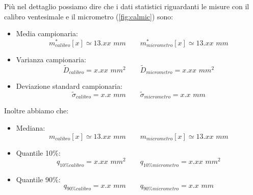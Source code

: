 \newpage
Più nel dettaglio possiamo dire che i dati statistici riguardanti le misure con il calibro ventesimale e il micrometro (\ref{fig:calmic}) sono:
\begin{itemize}
    \item{Media campionaria:}
        \begin{equation}
        m^*_{calibro}[x] \simeq 13.xx\,\,mm \qquad
        m^*_{micrometro}[x] \simeq 13.xx\,\,mm 
        \end{equation}

    \item{Varianza campionaria:}
        \begin{equation}
        \tilde{D}_{calibro} = x.xx\,\,mm^2 \qquad
        \tilde{D}_{micrometro} = x.xx\,\,mm^2
        \end{equation}

    \item{Deviazione standard campionaria:}
        \begin{equation}
        \tilde{\sigma}_{calibro} = x.x\,\,mm \qquad
        \tilde{\sigma}_{micrometro} = x.x\,\,mm
        \end{equation}
\end{itemize}
Inoltre abbiamo che:

\begin{itemize}
    \item{Mediana:}
        \begin{equation}
        m_{calibro}[x] \simeq 13.xx\,\,mm \qquad
        m_{micrometro}[x] \simeq 13.xx\,\,mm 
        \end{equation}

    \item{Quantile 10\%:}
        \begin{equation}
        q_{10\%calibro} = x.xx\,\,mm^2 \qquad
        q_{10\%micrometro} = x.xx\,\,mm^2
        \end{equation}

    \item{Quantile 90\%:}
        \begin{equation}
        q_{90\%calibro} = x.x\,\,mm \qquad
        q_{90\%micrometro} = x.x\,\,mm
        \end{equation}
\end{itemize}

